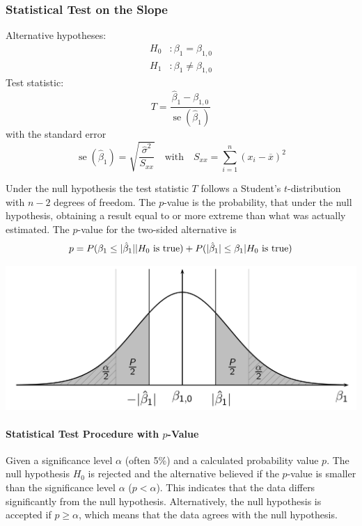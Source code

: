 \documentclass[11pt]{article}
\theoremstyle{definition}
\newcommand*\samplemean[1]{\overline{#1}}
\newcommand*\se[1]{\mathop{\text{se}}\left(#1\right)}
\DeclarePairedDelimiter\abs{\lvert}{\rvert}
\begin{document}
\subsubsection{Statistical Test on the Slope}
Alternative hypotheses:
\begin{align*}
	H_0 &: \beta_1 = \beta_{1,0}\\
	H_1 &: \beta_1 \neq \beta_{1,0}
\end{align*}
Test statistic:
\begin{equation*}
	T = \frac{\hat{\beta}_1 - \beta_{1,0}}{\se{\hat{\beta}_1}}
\end{equation*}
with the standard error
\begin{equation*}
	\se{\hat{\beta}_1} = \sqrt{\frac{\hat{\sigma}^2}{S_{xx}}}\quad\text{with}\quad S_{xx} = \sum_{i=1}^{n}(x_i - \samplemean{x})^2
\end{equation*}

Under the null hypothesis the test statistic $T$ follows a Student's $t$-distribution with $n-2$ degrees of freedom. The $p$-value is the probability, that under the null hypothesis, obtaining a result equal to or more extreme than what was actually estimated. The $p$-value for the two-sided alternative is
\begin{equation*}
	p = P(\beta_1 \leq \abs{\hat{\beta}_1} | H_0\text{ is true}) + P(\abs{\hat{\beta}_1} \leq \beta_1 | H_0\text{ is true})
\end{equation*}
\begin{center}
	\includegraphics[width=0.8\linewidth]{img/p_value}
\end{center}

\paragraph{Statistical Test Procedure with $p$-Value} Given a significance level $\alpha$ (often 5\%) and a calculated probability value $p$. The null hypothesis $H_0$ is rejected and the alternative believed if the $p$-value is smaller than the significance level $\alpha$ ($p < \alpha$). This indicates that the data differs significantly from the null hypothesis. Alternatively, the null hypothesis is accepted if $p\geq\alpha$, which means that the data agrees with the null hypothesis.
\end{document}
